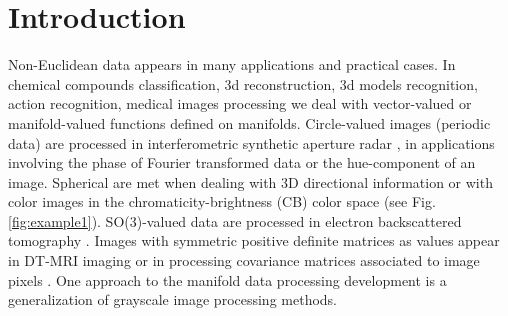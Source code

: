 \documentclass[twocolumn]{svjour3}          %
\begin{document}
\section{Introduction}
\label{intro}
%
Non-Euclidean data appears in many applications and practical cases. In chemical compounds classification, 3d reconstruction, 3d models recognition, action recognition, medical images processing we deal with vector-valued or manifold-valued functions defined on manifolds. Circle-valued images (periodic data) are processed in interferometric synthetic aperture radar \cite{CircleData1, CircleData2}, in applications involving the phase of Fourier transformed data \cite{CircleData3} or the hue-component of an image. Spherical are met when dealing with 3D directional information \cite{SphereData1, SphereData2} or with color images in the chromaticity-brightness (CB) color space \cite{SphereData3} (see Fig. \ref{fig:example1}). SO(3)-valued data are processed in electron backscattered tomography \cite{SO3Data1, SO3Data2}. Images with symmetric positive definite matrices as values appear in DT-MRI imaging \cite{SPDMatrixData1, SPDMatrixData2} or in processing covariance matrices associated to image pixels \cite{SPDMatrixData3}. One approach to the manifold data processing development is a generalization of grayscale image processing methods. 
\end{document}
